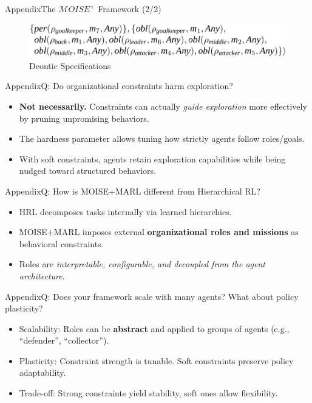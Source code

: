 \begin{frame}{Appendix}{The $\mathcal{M}OISE^+$ Framework (2/2)}
    \ \\

    \begin{minipage}{\textwidth}
        \centering
        \begin{figure}[H]
            \centering
            \includegraphics[width=0.4\linewidth]{figures/soccer_ds.png}
            \caption*{Deontic Specifications}
        \end{figure}
    \end{minipage}

\end{frame}

\begin{frame}{Appendix}{Q: Do organizational constraints harm exploration?}
    \begin{itemize}
        \item \textbf{Not necessarily.} Constraints can actually \textit{guide exploration} more effectively by pruning unpromising behaviors.
        \item The hardness parameter allows tuning how strictly agents follow roles/goals.
        \item With soft constraints, agents retain exploration capabilities while being nudged toward structured behaviors.
    \end{itemize}
\end{frame}

\begin{frame}{Appendix}{Q: How is MOISE+MARL different from Hierarchical RL?}
    \begin{itemize}
        \item HRL decomposes tasks internally via learned hierarchies.
        \item MOISE+MARL imposes external \textbf{organizational roles and missions} as behavioral constraints.
        \item Roles are \textit{interpretable, configurable, and decoupled from the agent architecture}.
    \end{itemize}
\end{frame}

\begin{frame}{Appendix}{Q: Does your framework scale with many agents? What about policy plasticity?}
    \begin{itemize}
        \item Scalability: Roles can be \textbf{abstract} and applied to groups of agents (e.g., “defender”, “collector”).
        \item Plasticity: Constraint strength is tunable. Soft constraints preserve policy adaptability.
        \item Trade-off: Strong constraints yield stability, soft ones allow flexibility.
    \end{itemize}
\end{frame}

